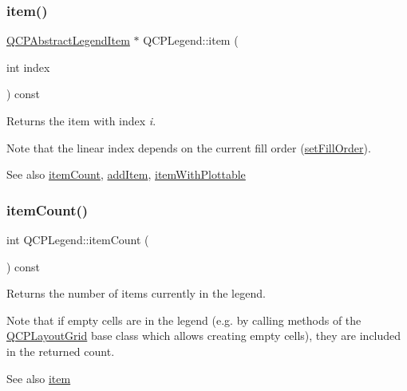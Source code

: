 \mbox{\label{class_q_c_p_legend_acfe9694c45104a3359d3806ed366fcf7}} 
\subsubsection{\texorpdfstring{item()}{item()}}
{\footnotesize\ttfamily \mbox{\hyperlink{class_q_c_p_abstract_legend_item}{Q\+C\+P\+Abstract\+Legend\+Item}} $\ast$ Q\+C\+P\+Legend\+::item (\begin{DoxyParamCaption}\item[{int}]{index }\end{DoxyParamCaption}) const}

Returns the item with index {\itshape i}.

Note that the linear index depends on the current fill order (\mbox{\hyperlink{class_q_c_p_layout_grid_affc2f3cfd22f28698c5b29b960d2a391}{set\+Fill\+Order}}).

\begin{DoxySeeAlso}{See also}
\mbox{\hyperlink{class_q_c_p_legend_a57ab86ab8b2a3762d4c1455eb5452c88}{item\+Count}}, \mbox{\hyperlink{class_q_c_p_legend_a3ab274de52d2951faea45a6d975e6b3f}{add\+Item}}, \mbox{\hyperlink{class_q_c_p_legend_a91e790002d8bf15a20628a8e8841e397}{item\+With\+Plottable}} 
\end{DoxySeeAlso}
\mbox{\label{class_q_c_p_legend_a57ab86ab8b2a3762d4c1455eb5452c88}} 
\subsubsection{\texorpdfstring{itemCount()}{itemCount()}}
{\footnotesize\ttfamily int Q\+C\+P\+Legend\+::item\+Count (\begin{DoxyParamCaption}{ }\end{DoxyParamCaption}) const}

Returns the number of items currently in the legend.

Note that if empty cells are in the legend (e.\+g. by calling methods of the \mbox{\hyperlink{class_q_c_p_layout_grid}{Q\+C\+P\+Layout\+Grid}} base class which allows creating empty cells), they are included in the returned count.

\begin{DoxySeeAlso}{See also}
\mbox{\hyperlink{class_q_c_p_legend_acfe9694c45104a3359d3806ed366fcf7}{item}} 
\end{DoxySeeAlso}
\mbox{\label{class_q_c_p_legend_a91e790002d8bf15a20628a8e8841e397}} 
